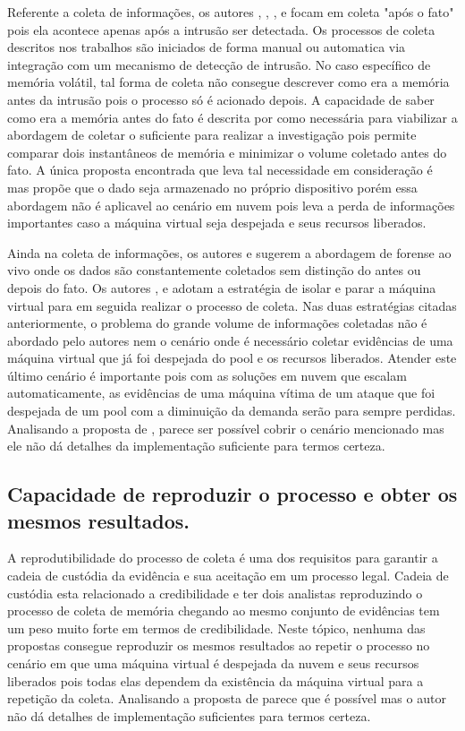 \documentclass[conference]{IEEEtran}
\begin{document}
Referente a coleta de informações, os autores \cite{Reichert2015}, \cite{Poisel2013}, \cite{Dykstra2013}, \cite{George2012} e \cite{Sang2013}
focam em coleta "após o fato" pois ela acontece apenas após a intrusão ser detectada. Os processos de coleta descritos nos trabalhos são iniciados de forma manual ou 
automatica via integração com um mecanismo de detecção de intrusão. No caso específico de memória volátil, tal forma de coleta não consegue descrever como era 
a memória antes da intrusão pois o processo só é acionado depois. A capacidade de saber como era a memória antes do fato é descrita por \cite{Case2014} como necessária 
para viabilizar a abordagem de coletar o suficiente para realizar a investigação pois permite comparar dois instantâneos de memória e minimizar o volume coletado antes 
do fato. A única proposta encontrada que leva tal necessidade em consideração é \cite{Dezfouli2012} mas propõe que o dado seja armazenado no próprio dispositivo porém 
essa abordagem não é aplicavel ao cenário em nuvem pois leva a perda de informações importantes caso a máquina virtual seja despejada e seus recursos liberados.

Ainda na coleta de informações, os autores \cite{Reichert2015} e \cite{George2012} sugerem a abordagem de forense ao vivo onde os dados são constantemente coletados sem 
distinção do antes ou depois do fato. Os autores \cite{Poisel2013}, \cite{Dykstra2013} e \cite{Sang2013} adotam a estratégia de isolar e parar a máquina virtual para 
em seguida realizar o processo de coleta. Nas duas estratégias citadas anteriormente, o problema do grande volume de informações coletadas não é abordado pelo autores 
nem o cenário onde é necessário coletar evidências de uma máquina virtual que já foi despejada do pool e os recursos liberados. Atender este último cenário é importante pois 
com as soluções em nuvem que escalam automaticamente, as evidências de uma máquina vítima de um ataque que foi despejada de um pool com a diminuição da demanda serão 
para sempre perdidas. Analisando a proposta de \cite{Poisel2013}, parece ser possível cobrir o cenário mencionado mas ele não dá detalhes da implementação suficiente
para termos certeza.

\subsection{Capacidade de reproduzir o processo e obter os mesmos resultados.}

A reprodutibilidade do processo de coleta é uma dos requisitos para garantir a cadeia de custódia da evidência e sua aceitação em um processo legal. Cadeia de custódia 
esta relacionado a credibilidade e ter dois analistas reproduzindo o processo de coleta de memória chegando ao mesmo conjunto de evidências tem um peso muito forte em 
termos de credibilidade. Neste tópico, nenhuma das propostas consegue reproduzir os mesmos resultados ao repetir o processo no cenário em que uma máquina virtual é 
despejada da nuvem e seus recursos liberados pois todas elas dependem da existência da máquina virtual para a repetição da coleta. Analisando a proposta de 
\cite{George2012} parece que é possível mas o autor não dá detalhes de implementação suficientes para termos certeza.
\end{document}

